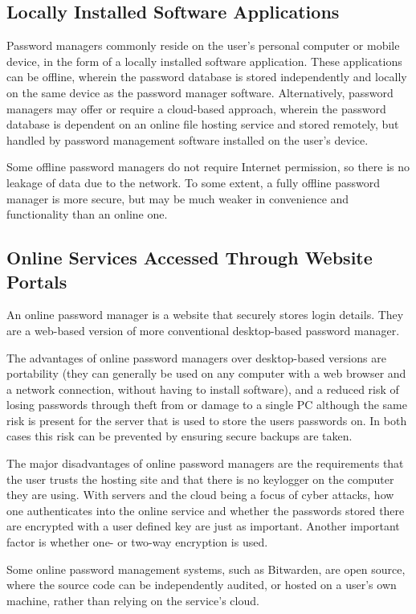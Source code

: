 \subsection*{Locally Installed Software Applications}
Password managers commonly reside on the user's personal computer or mobile device, in the form of a locally installed software application. These applications can be offline, wherein the password database is stored independently and locally on the same device as the password manager software. Alternatively, password managers may offer or require a cloud-based approach, wherein the password database is dependent on an online file hosting service and stored remotely, but handled by password management software installed on the user's device.

Some offline password managers do not require Internet permission, so there is no leakage of data due to the network. To some extent, a fully offline password manager is more secure, but may be much weaker in convenience and functionality than an online one.


\subsection*{Online Services Accessed Through Website Portals}

An online password manager is a website that securely stores login details. They are a web-based version of more conventional desktop-based password manager.

The advantages of online password managers over desktop-based versions are portability (they can generally be used on any computer with a web browser and a network connection, without having to install software), and a reduced risk of losing passwords through theft from or damage to a single PC although the same risk is present for the server that is used to store the users passwords on. In both cases this risk can be prevented by ensuring secure backups are taken.

The major disadvantages of online password managers are the requirements that the user trusts the hosting site and that there is no keylogger on the computer they are using. With servers and the cloud being a focus of cyber attacks, how one authenticates into the online service and whether the passwords stored there are encrypted with a user defined key are just as important. Another important factor is whether one- or two-way encryption is used.

Some online password management systems, such as Bitwarden, are open source, where the source code can be independently audited, or hosted on a user's own machine, rather than relying on the service's cloud.

